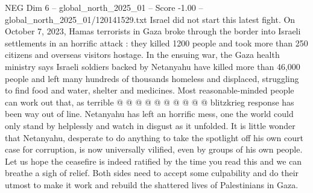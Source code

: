 \begin{textsample}{NEG Dim 6 – global\_north\_2025\_01 – Score -1.00 – global\_north\_2025\_01/120141529.txt}
Israel did not start this latest fight.
On October 7, 2023, Hamas terrorists in Gaza broke through the border into Israeli settlements in an horrific attack : they killed 1200 people and took more than 250 citizens and overseas visitors hostage.
In the ensuing war, the Gaza health ministry says Israeli soldiers backed by Netanyahu have killed more than 46,000 people and left many hundreds of thousands homeless and displaced, struggling to find food and water, shelter and medicines.
Most reasonable-minded people can work out that, as terrible @ @ @ @ @ @ @ @ @ @ blitzkrieg response has been way out of line.
Netanyahu has left an horrific mess, one the world could only stand by helplessly and watch in disgust as it unfolded.
It is little wonder that Netanyahu, desperate to do anything to take the spotlight off his own court case for corruption, is now universally vilified, even by groups of his own people.
Let us hope the ceasefire is indeed ratified by the time you read this and we can breathe a sigh of relief.
Both sides need to accept some culpability and do their utmost to make it work and rebuild the shattered lives of Palestinians in Gaza.

\end{textsample}
